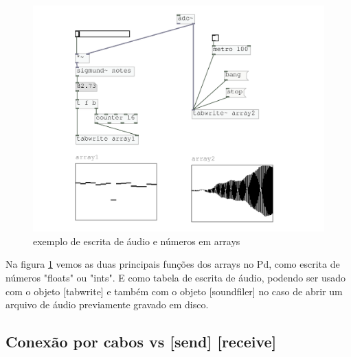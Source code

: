 \documentclass[draft]{ppgmus}
\begin{document}
\begin{figure}
\includegraphics[scale=.6]{escrita-array}
\caption{exemplo de escrita de áudio e números em arrays}
\label{escritaarray}
\end{figure}

Na figura \ref{escritaarray} vemos as duas principais funções dos arrays
no Pd, como escrita de números "floats" ou "ints". E como tabela de escrita
de áudio, podendo ser usado com o objeto [tabwrite\texttildelow] e também
com o objeto [soundfiler] no caso de abrir um arquivo de áudio previamente
gravado em disco.


\subsection{Conexão por cabos vs [send] [receive]}
\end{document}
